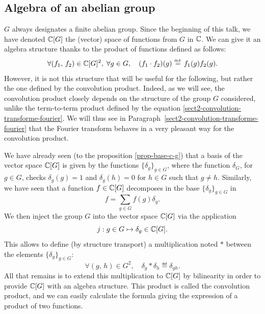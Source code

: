 \subsection{Algebra of an abelian group}
\label{sect2-algebre-grpe-abelien}


  $G$ always designates a finite abelian group. Since the beginning of this talk, we have denoted $\mathbb{C}[G]$ the (vector) space of functions from $G$ in $\mathbb{C}$. We can give it an algebra structure thanks to the product of functions defined as follows:
\begin{equation}
\label{eq-defn-prod-term-term-functions}
\forall (f_1, \, f_2) \in \mathbb{C}[G]^2, \; \forall g \in G, \quad (f_1 \cdot f_2)(g) \stackrel{\mbox{\upshape\tiny def.}}{=} f_1(g) f_2(g).
\end{equation}
However, it is not this structure that will be useful for the following, but rather the one defined by the convolution product. Indeed, as we will see, the convolution product closely depends on the structure of the group $G$ considered, unlike the term-to-term product defined by the equation \eqref{sect2-convolution-transforme-fourier}. We will thus see in Paragraph~\ref{sect2-convolution-transforme-fourier} that the Fourier transform behaves in a very pleasant way for the convolution product.


 We have already seen (to the proposition \ref{prop-base-c-g}) that a basis of the vector space $\mathbb{C}[G]$ is given by the functions $\{\delta_g\}_{g \in G}$, where the function $\delta_G$, for $g \in G$, checks $\delta_g(g) = 1$ and $\delta_g(h) = 0 $ for $ h \in G$ such that $g \neq h$. Similarly, we have seen that a function $ f \in \mathbb{C}[G]$ decomposes in the base $\{\delta_g\}_{g \in G}$ in
\begin{equation*}
f = \sum_{g \in G}{f(g) \delta_g}.
\end{equation*}
We then inject the group $G$ into the vector space $\mathbb{C}[G]$ via the application
\begin{equation*}
j: g \in G \mapsto \delta_g \in \mathbb{C}[G].
\end{equation*}
This allows to define (by structure transport) a multiplication noted $ *$ between the elements $\{\delta_g\}_{g \in G}$:
\begin{equation*}
\forall (g, \, h) \in G^2, \quad \delta_g * \delta_h \eqdef \delta_{g h}.
\end{equation*}
All that remains is to extend this multiplication to $\mathbb{C}[G]$ by bilinearity in order to provide $\mathbb{C}[G]$ with an algebra structure. This product is called the convolution product, and we can easily calculate the formula giving the expression of a product of two functions.

